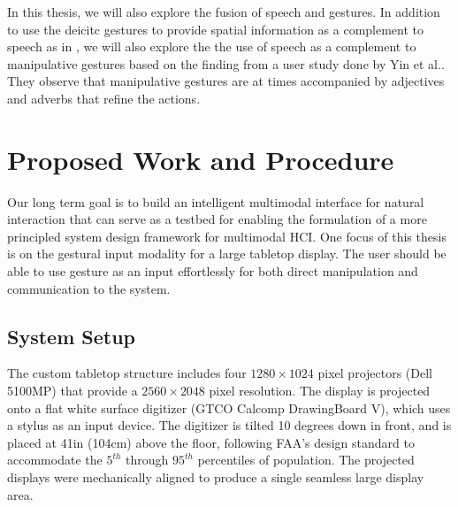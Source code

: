 In this thesis, we will also explore the fusion of speech and gestures. In
addition to use the deicitc gestures to provide spatial information as a complement to
speech as in \cite{Rauschert02}, we will also explore the the use of speech as a
complement to manipulative gestures based on the finding from a user study done
by Yin et al.\cite{yin10}. They observe that manipulative gestures are at times
accompanied by adjectives and adverbs that refine the actions.

\section{Proposed Work and Procedure}
Our long term goal is to build an intelligent multimodal interface for natural
interaction that can serve as a testbed for enabling the formulation of a more
principled system design framework for multimodal HCI. One focus of this thesis
is on the gestural input modality for a large tabletop display. The user should
be able to use gesture as an input effortlessly for both direct manipulation and communication to the system.

\subsection{System Setup}
The custom tabletop structure includes four $1280\times1024$ pixel projectors 
(Dell 5100MP) that provide a $2560\times2048$ pixel resolution. The
display is projected onto a flat white surface digitizer (GTCO Calcomp DrawingBoard V), 
which uses a stylus as an input device. The digitizer is tilted 10 degrees down 
in front, and is placed at 41in (104cm) above the floor, following FAA's design 
standard to accommodate the $5^{th}$ through $95^{th}$ percentiles of 
population. The projected displays were mechanically aligned to produce a single 
seamless large display area.

